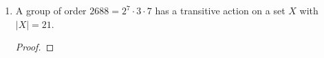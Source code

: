 \documentclass[../psets.tex]{subfiles}
\begin{document}
\begin{enumerate}
\begin{enumerate}
\begin{proof}
            Therefore, $G\leq A_{|G|+2}$, and we have proven that the statement is
            \begin{equation*}
                \boxed{\text{True.}}
            \end{equation*}
        \end{proof}
        \item A group of order $2688=2^7\cdot 3\cdot 7$ has a transitive action on a set $X$ with $|X|=21$.
        \begin{proof}



\end{proof}
\end{enumerate}
\end{enumerate}
\end{document}
